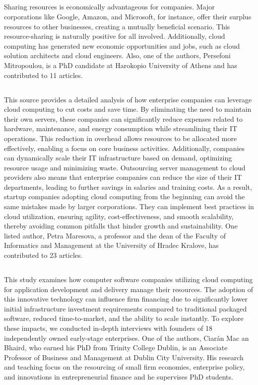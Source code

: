 \documentclass[12pt,letterpaper]{article}
\begin{document}
\subsection*{}
Sharing resources is economically advantageous for companies. Major corporations like Google, Amazon, and Microsoft, for instance, offer their surplus resources to other businesses, creating a mutually beneficial scenario. This resource-sharing is naturally positive for all involved. Additionally, cloud computing has generated new economic opportunities and jobs, such as cloud solution architects and cloud engineers. Also, one of the authors, Persefoni Mitropoulou, is a PhD candidate at Harokopio University of Athens and has contributed to 11 articles.

\subsection*{}
This source provides a detailed analysis of how enterprise companies can leverage cloud computing to cut costs and save time. By eliminating the need to maintain their own servers, these companies can significantly reduce expenses related to hardware, maintenance, and energy consumption while streamlining their IT operations. This reduction in overhead allows resources to be allocated more effectively, enabling a focus on core business activities. Additionally, companies can dynamically scale their IT infrastructure based on demand, optimizing resource usage and minimizing waste. Outsourcing server management to cloud providers also means that enterprise companies can reduce the size of their IT departments, leading to further savings in salaries and training costs. As a result, startup companies adopting cloud computing from the beginning can avoid the same mistakes made by larger corporations. They can implement best practices in cloud utilization, ensuring agility, cost-effectiveness, and smooth scalability, thereby avoiding common pitfalls that hinder growth and sustainability. One listed author, Petra Maresova, a professor and the dean of the Faculty of Informatics and Management at the University of Hradec Kralove, has contributed to 23 articles.

\subsection*{}
This study examines how computer software companies utilizing cloud computing for application development and delivery manage their resources. The adoption of this innovative technology can influence firm financing due to significantly lower initial infrastructure investment requirements compared to traditional packaged software, reduced time-to-market, and the ability to scale instantly. To explore these impacts, we conducted in-depth interviews with founders of 18 independently owned early-stage enterprises. One of the authors, Ciarán Mac an Bhaird, who earned his PhD from Trinity College Dublin, is an Associate Professor of Business and Management at Dublin City University. His research and teaching focus on the resourcing of small firm economies, enterprise policy, and innovations in entrepreneurial finance and he supervises PhD students.
\end{document}
